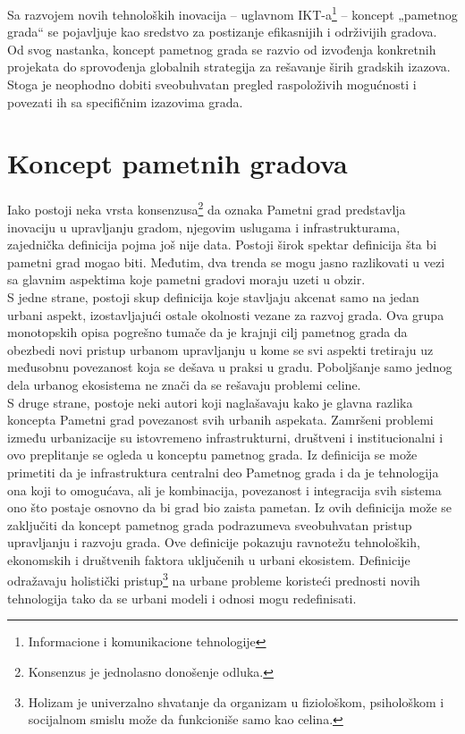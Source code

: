 \documentclass[a4paper,12pt]{article}
\begin{document}
{Sa razvojem novih tehnoloških inovacija – uglavnom IKT-a\footnote{Informacione i komunikacione tehnologije} – koncept „pametnog grada“ se pojavljuje kao sredstvo za postizanje efikasnijih i održivijih gradova. \\

Od svog nastanka, koncept pametnog grada se razvio od izvođenja konkretnih projekata do sprovođenja globalnih strategija za rešavanje širih gradskih izazova. Stoga je neophodno dobiti sveobuhvatan pregled raspoloživih mogućnosti i povezati ih sa specifičnim izazovima grada.


\section{Koncept pametnih gradova}


Iako postoji neka vrsta konsenzusa\footnote{Konsenzus je jednolasno donošenje odluka.} da oznaka Pametni grad predstavlja inovaciju u upravljanju gradom, njegovim uslugama i infrastrukturama, zajednička definicija pojma još nije data. Postoji širok spektar definicija šta bi pametni grad mogao biti. Međutim, dva trenda se mogu jasno razlikovati u vezi sa glavnim aspektima koje pametni gradovi moraju uzeti u obzir. \\

S jedne strane, postoji skup definicija koje stavljaju akcenat samo na jedan urbani aspekt, izostavljajući ostale okolnosti vezane za razvoj grada. Ova grupa monotopskih opisa pogrešno tumače da je krajnji cilj pametnog grada da obezbedi novi pristup urbanom upravljanju u kome se svi aspekti tretiraju uz međusobnu povezanost koja se dešava u praksi u gradu. Poboljšanje samo jednog dela urbanog ekosistema ne znači da se rešavaju problemi celine. \\

S druge strane, postoje neki autori koji naglašavaju kako je glavna razlika koncepta Pametni grad povezanost svih urbanih aspekata. Zamršeni problemi između urbanizacije su istovremeno infrastrukturni, društveni i institucionalni i ovo preplitanje se ogleda u konceptu pametnog grada. Iz definicija se može primetiti da je infrastruktura centralni deo Pametnog grada i da je tehnologija ona koji to omogućava, ali je kombinacija, povezanost i integracija svih sistema ono što postaje osnovno da bi grad bio zaista pametan. Iz ovih definicija može se zaključiti da koncept pametnog grada podrazumeva sveobuhvatan pristup upravljanju i razvoju grada. Ove definicije pokazuju ravnotežu tehnoloških, ekonomskih i društvenih faktora uključenih u urbani ekosistem. Definicije odražavaju holistički pristup\footnote{Holizam je univerzalno shvatanje da organizam u fiziološkom, psihološkom i socijalnom smislu može da funkcioniše samo kao celina. 
} na urbane probleme koristeći prednosti novih tehnologija tako da se urbani modeli i odnosi mogu redefinisati.\cite{referenca2}\\

}
\end{document}
